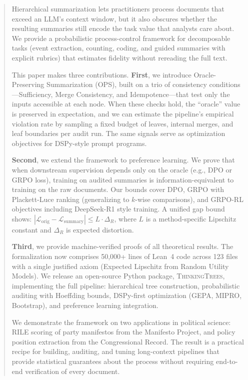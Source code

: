 \begin{abstract}
Hierarchical summarization lets practitioners process documents that exceed an LLM's context window, but it also obscures whether the resulting summaries still encode the task value that analysts care about. We provide a probabilistic process-control framework for decomposable tasks (event extraction, counting, coding, and guided summaries with explicit rubrics) that estimates fidelity without rereading the full text.

This paper makes three contributions. \textbf{First}, we introduce Oracle-Preserving Summarization (OPS), built on a trio of consistency conditions---Sufficiency, Merge Consistency, and Idempotence---that test only the inputs accessible at each node. When these checks hold, the ``oracle'' value is preserved in expectation, and we can estimate the pipeline's empirical violation rate by sampling a fixed budget of leaves, internal merges, and leaf boundaries per audit run. The same signals serve as optimization objectives for DSPy-style prompt programs.

\textbf{Second}, we extend the framework to preference learning. We prove that when downstream supervision depends only on the oracle (e.g., DPO or GRPO loss), training on audited summaries is information-equivalent to training on the raw documents. Our bounds cover DPO, GRPO with Plackett-Luce ranking (generalizing to $k$-wise comparisons), and GRPO-RL objectives including DeepSeek-R1 style training. A unified gap bound shows: $|\mathcal{L}_{\text{orig}} - \mathcal{L}_{\text{summary}}| \le L \cdot \Delta_R$, where $L$ is a method-specific Lipschitz constant and $\Delta_R$ is expected distortion.

\textbf{Third}, we provide machine-verified proofs of all theoretical results. The formalization now comprises 50,000+ lines of Lean~4 code across 123 files with a single justified axiom (Expected Lipschitz from Random Utility Models). We release an open-source Python package, \textsc{ThinkingTrees}, implementing the full pipeline: hierarchical tree construction, probabilistic auditing with Hoeffding bounds, DSPy-first optimization (GEPA, MIPRO, Bootstrap), and preference learning integration.

We demonstrate the framework on two applications in political science: RILE scoring of party manifestos from the Manifesto Project, and policy position extraction from the Congressional Record. The result is a practical recipe for building, auditing, and tuning long-context pipelines that provide statistical guarantees about the process without requiring end-to-end verification of every document.
\end{abstract}
